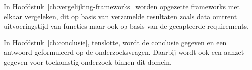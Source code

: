 In Hoofdstuk~\ref{ch:vergelijking-frameworks} worden opgezette frameworks met elkaar vergeleken, dit op basis van verzamelde resultaten zoals data omtrent uitvoeringstijd van functies maar ook op basis van de gecapteerde requirements.

In Hoofdstuk~\ref{ch:conclusie}, tenslotte, wordt de conclusie gegeven en een antwoord geformuleerd op de onderzoeksvragen. Daarbij wordt ook een aanzet gegeven voor toekomstig onderzoek binnen dit domein.

